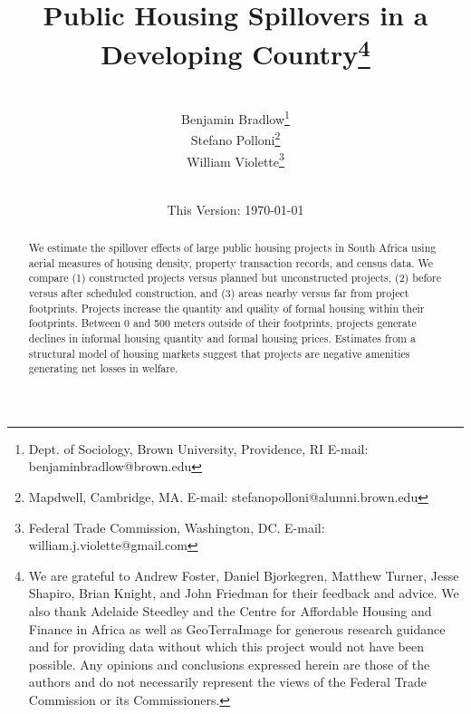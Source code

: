 \documentclass[12pt]{article}
\begin{document}
\begin{titlepage} 
\title{{Public Housing Spillovers in a Developing Country}\thanks{We are grateful to Andrew Foster, Daniel Bjorkegren, Matthew Turner, Jesse Shapiro, Brian Knight, and John Friedman for their feedback and advice.  We also thank Adelaide Steedley and the Centre for Affordable Housing and Finance in Africa as well as GeoTerraImage for generous research guidance and for providing data without which this project would not have been possible.  Any opinions and conclusions expressed herein are those of the authors and do not necessarily represent the views of the Federal Trade Commission or its Commissioners.}}
\author{\\[3em] Benjamin Bradlow\thanks{Dept. of Sociology, Brown University, Providence, RI  E-mail: benjamin\textunderscore bradlow@brown.edu}\\
 Stefano Polloni\thanks{Mapdwell, Cambridge, MA.  E-mail: stefano\textunderscore polloni@alumni.brown.edu}\\ 
  William Violette\thanks{Federal Trade Commission, Washington, DC. E-mail: william.j.violette@gmail.com} \\
 \\ 
  }
\date{\vspace{5mm}This Version: \today}
\maketitle
\begin{abstract}




	We estimate the spillover effects of large public housing projects in South Africa using aerial measures of housing density, property transaction records, and census data.  We compare (1) constructed projects versus planned but unconstructed projects, (2) before versus after scheduled construction, and (3) areas nearby versus far from project footprints.  Projects increase the quantity and quality of formal housing within their footprints.  Between 0 and 500 meters outside of their footprints, projects generate declines in informal housing quantity and formal housing prices.  Estimates from a structural model of housing markets suggest that projects are negative amenities generating net losses in welfare.


\end{abstract}
\end{titlepage}
\end{document}
